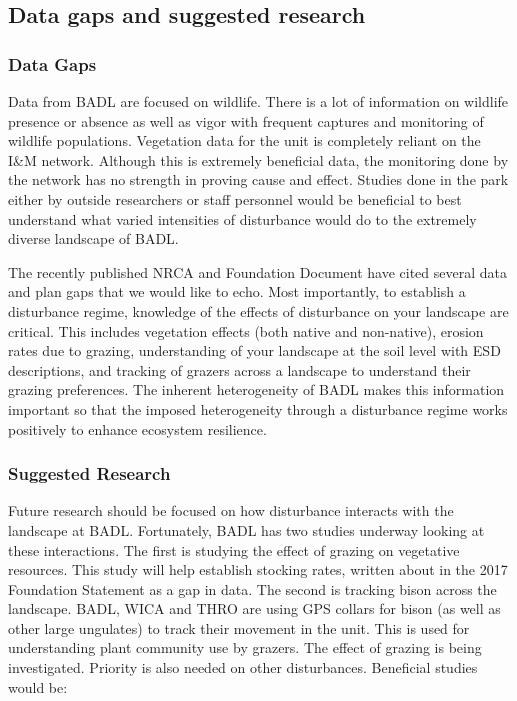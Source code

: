 \subsection{Data gaps and suggested research}

\subsubsection{Data Gaps}

Data from BADL are focused on wildlife. 
There is a lot of information on wildlife presence or absence as well as vigor with frequent captures and monitoring of wildlife populations. 
Vegetation data for the unit is completely reliant on the I\&M network.
Although this is extremely beneficial data, the monitoring done by the network has no strength in proving cause and effect. 
Studies done in the park either by outside researchers or staff personnel would be beneficial to best understand what varied intensities of disturbance would do to the extremely diverse landscape of BADL.

The recently published NRCA and Foundation Document have cited several data and plan gaps that we would like to echo. 
Most importantly, to establish a disturbance regime, knowledge of the effects of disturbance on your landscape are critical. 
This includes vegetation effects (both native and non-native), erosion rates due to grazing, understanding of your landscape at the soil level with ESD descriptions, and tracking of grazers across a landscape to understand their grazing preferences. 
The inherent heterogeneity of BADL makes this information important so that the imposed heterogeneity through a disturbance regime works positively to enhance ecosystem resilience.

\subsubsection{Suggested Research}

Future research should be focused on how disturbance interacts with the landscape at BADL. 
Fortunately, BADL has two studies underway looking at these interactions. 
The first is studying the effect of grazing on vegetative resources. 
This study will help establish stocking rates, written about in the 2017 Foundation Statement as a gap in data. 
The second is tracking bison across the landscape. 
BADL, WICA and THRO are using GPS collars for bison (as well as other large ungulates) to track their movement in the unit. 
This is used for understanding plant community use by grazers. 
The effect of grazing is being investigated.
Priority is also needed on other disturbances. 
Beneficial studies would be:

